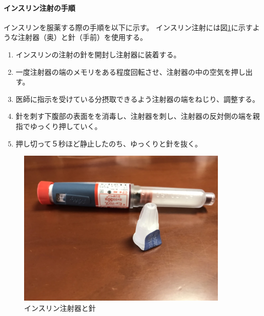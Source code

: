 \paragraph{インスリン注射の手順}
\label{paragraph:insulin_injection_steps}

インスリンを服薬する際の手順を以下に示す。
インスリン注射には図\ref{fig:insulin_pen_needle}に示すような注射器（奥）と針（手前）を使用する。

\begin{enumerate}
  \item インスリンの注射の針を開封し注射器に装着する。
  \item 一度注射器の端のメモリをある程度回転させ、注射器の中の空気を押し出す。
  \item 医師に指示を受けている分摂取できるよう注射器の端をねじり、調整する。
  \item 針を刺す下腹部の表面をを消毒し、注射器を刺し、注射器の反対側の端を親指でゆっくり押していく。
  \item 押し切って５秒ほど静止したのち、ゆっくりと針を抜く。
\end{enumerate}

\begin{figure}[htbp]
  \caption{インスリン注射器と針}
  \label{fig:insulin_pen_needle}
  \begin{center}
    \includegraphics[bb=0 0 1300 1200,width=10cm]{assets/insulin_pen_needle.jpg}
  \end{center}
\end{figure}
